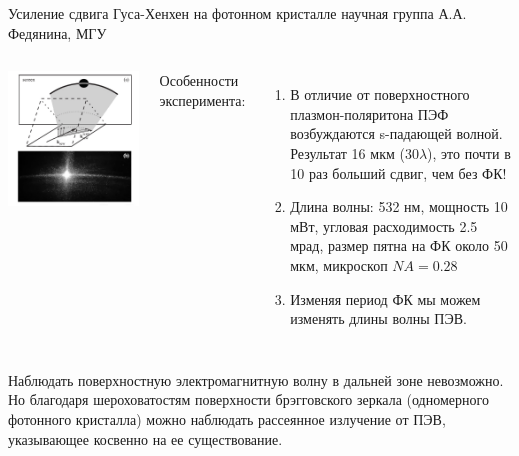 \documentclass[9pt, compress, xcolor=table]{beamer}
\begin{document}
\begin{frame}{Усиление сдвига Гуса-Хенхен на фотонном кристалле}
 научная группа А.А. Федянина, МГУ
\begin{columns}[c]
\column{6.5cm}
\begin{center}
\includegraphics[scale=0.3]{gh3}
\end{center}

\column{6.5cm} 
Особенности эксперимента:

\begin{enumerate}

\item В отличие от поверхностного плазмон-поляритона ПЭФ возбуждаются s-падающей волной.
    Результат 16 мкм ($30 \lambda$), это почти в 10 раз больший сдвиг, чем без ФК!

\item Длина волны: 532 нм, мощность 10 мВт, угловая расходимость 2.5 мрад, размер пятна на ФК около 50 мкм, микроскоп $NA = 0.28$

\item Изменяя период ФК мы можем изменять длины волны ПЭВ.
\end{enumerate}

\end{columns}
Наблюдать поверхностную электромагнитную волну в дальней зоне невозможно. Но
благодаря шероховатостям поверхности брэгговского зеркала (одномерного фотонного кристалла) можно
наблюдать рассеянное излучение от ПЭВ, указывающее косвенно на ее существование.

\end{frame}
\end{document}
